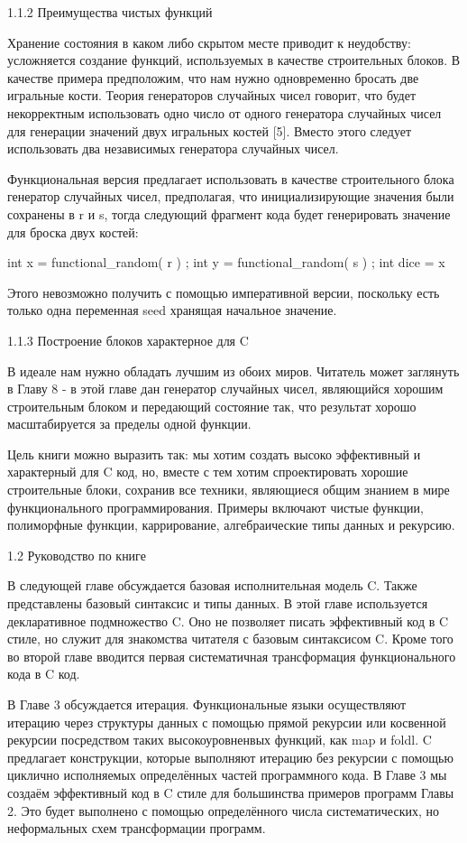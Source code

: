 1.1.2 Преимущества чистых функций

Хранение состояния в каком либо скрытом месте приводит к неудобству: усложняется создание функций, используемых в качестве строительных блоков. В качестве примера предположим, что нам нужно одновременно бросать две игральные кости. Теория генераторов случайных чисел говорит, что будет некорректным использовать одно число от одного генератора случайных чисел для генерации значений двух игральных костей [5]. Вместо этого следует использовать два независимых генератора случайных чисел.

Функциональная версия предлагает использовать в качестве строительного блока генератор случайных чисел, предполагая, что инициализирующие значения были сохранены в r и s, тогда следующий фрагмент кода будет генерировать значение для броска двух костей:

int x = functional_random( r ) ;
int y = functional_random( s ) ;
int dice = x%

Этого невозможно получить с помощью императивной версии, поскольку есть только одна переменная seed хранящая начальное значение.

1.1.3 Построение блоков характерное для C

В идеале нам нужно обладать лучшим из обоих миров. Читатель может заглянуть в Главу 8 - в этой главе дан генератор случайных чисел, являющийся хорошим строительным блоком и передающий состояние так, что результат хорошо масштабируется за пределы одной функции.

Цель книги можно выразить так: мы хотим создать высоко эффективный и характерный для C код, но, вместе с тем хотим спроектировать хорошие строительные блоки, сохранив все техники, являющиеся общим знанием в мире функционального программирования. Примеры включают чистые функции, полиморфные функции, каррирование, алгебраические типы данных и рекурсию.

1.2 Руководство по книге

В следующей главе обсуждается базовая исполнительная модель C. Также представлены базовый синтаксис и типы данных. В этой главе используется декларативное подмножество C. Оно не позволяет писать эффективный код в C стиле, но служит для знакомства читателя с базовым синтаксисом C. Кроме того во второй главе вводится первая систематичная трансформация функционального кода в C код.

В Главе 3 обсуждается итерация. Функциональные языки осуществляют итерацию через структуры данных с помощью прямой рекурсии или косвенной рекурсии посредством таких высокоуровненвых функций, как map и foldl. C предлагает конструкции, которые выполняют итерацию без рекурсии с помощью циклично исполняемых определённых частей программного кода. В Главе 3 мы создаём эффективный код в C стиле для большинства примеров программ Главы 2. Это будет выполнено с помощью определённого числа систематических, но неформальных схем трансформации программ.

